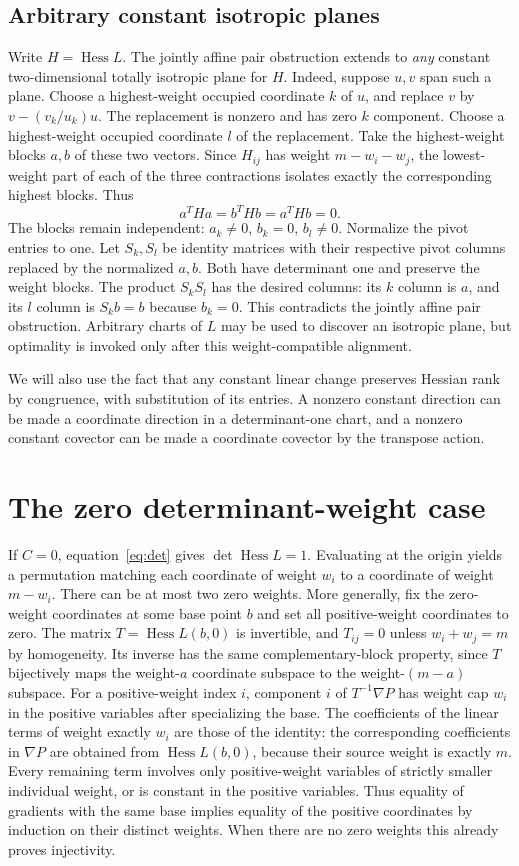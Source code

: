 \documentclass[11pt,a4paper]{article}
\newcommand{\Hess}{\operatorname{Hess}}
\begin{document}
\subsection{Arbitrary constant isotropic planes}\label{sec:plane}
Write $H=\Hess L$. The jointly affine pair obstruction extends to \emph{any} constant two-dimensional totally isotropic plane for $H$. Indeed, suppose $u,v$ span such a plane. Choose a highest-weight occupied coordinate $k$ of $u$, and replace $v$ by $v-(v_k/u_k)u$. The replacement is nonzero and has zero $k$ component. Choose a highest-weight occupied coordinate $l$ of the replacement. Take the highest-weight blocks $a,b$ of these two vectors. Since $H_{ij}$ has weight $m-w_i-w_j$, the lowest-weight part of each of the three contractions isolates exactly the corresponding highest blocks. Thus
\[
 a^THa=b^THb=a^THb=0.
\]
The blocks remain independent: $a_k\ne0$, $b_k=0$, $b_l\ne0$. Normalize the pivot entries to one. Let $S_k,S_l$ be identity matrices with their respective pivot columns replaced by the normalized $a,b$. Both have determinant one and preserve the weight blocks. The product $S_kS_l$ has the desired columns: its $k$ column is $a$, and its $l$ column is $S_kb=b$ because $b_k=0$. This contradicts the jointly affine pair obstruction. Arbitrary charts of $L$ may be used to discover an isotropic plane, but optimality is invoked only after this weight-compatible alignment.

We will also use the fact that any constant linear change preserves Hessian rank by congruence, with substitution of its entries. A nonzero constant direction can be made a coordinate direction in a determinant-one chart, and a nonzero constant covector can be made a coordinate covector by the transpose action.


\section{The zero determinant-weight case}\label{sec:zero}
If $C=0$, equation~\eqref{eq:det} gives $\det\Hess L=1$. Evaluating at the origin yields a permutation matching each coordinate of weight $w_i$ to a coordinate of weight $m-w_i$. There can be at most two zero weights. More generally, fix the zero-weight coordinates at some base point $b$ and set all positive-weight coordinates to zero. The matrix $T=\Hess L(b,0)$ is invertible, and $T_{ij}=0$ unless $w_i+w_j=m$ by homogeneity. Its inverse has the same complementary-block property, since $T$ bijectively maps the weight-$a$ coordinate subspace to the weight-$(m-a)$ subspace. For a positive-weight index $i$, component $i$ of $T^{-1}\nabla P$ has weight cap $w_i$ in the positive variables after specializing the base. The coefficients of the linear terms of weight exactly $w_i$ are those of the identity: the corresponding coefficients in $\nabla P$ are obtained from $\Hess L(b,0)$, because their source weight is exactly $m$. Every remaining term involves only positive-weight variables of strictly smaller individual weight, or is constant in the positive variables. Thus equality of gradients with the same base implies equality of the positive coordinates by induction on their distinct weights. When there are no zero weights this already proves injectivity.
\end{document}
